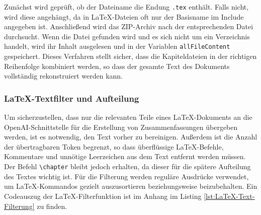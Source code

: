 
Zunächst wird geprüft, ob der Dateiname die Endung \texttt{.tex} enthält. Falls nicht, wird diese angehängt, da in LaTeX-Dateien oft nur der Basisname im Include angegeben ist. Anschließend wird das ZIP-Archiv nach der entsprechenden Datei durchsucht. Wenn die Datei gefunden wird und es sich nicht um ein Verzeichnis handelt, wird ihr Inhalt ausgelesen und in der Variablen \texttt{allFileContent} gespeichert. Dieses Verfahren stellt sicher, dass die Kapiteldateien in der richtigen Reihenfolge kombiniert werden, so dass der gesamte Text des Dokuments vollständig rekonstruiert werden kann.

\subsubsection{LaTeX-Textfilter und Aufteilung}

Um sicherzustellen, dass nur die relevanten Teile eines LaTeX-Dokuments an die OpenAI-Schnittstelle für die Erstellung von Zusammenfassungen übergeben werden, ist es notwendig, den Text vorher zu bereinigen. Außerdem ist die Anzahl der übertragbaren Token begrenzt, so dass überflüssige LaTeX-Befehle, Kommentare und unnötige Leerzeichen aus dem Text entfernt werden müssen. Der Befehl \texttt{\textbackslash chapter} bleibt jedoch erhalten, da dieser für die spätere Aufteilung des Textes wichtig ist. Für die Filterung werden reguläre Ausdrücke verwendet, um LaTeX-Kommandos gezielt auszusortieren beziehungsweise beizubehalten. Ein Codeauszug der LaTeX-Filterfunktion ist im Anhang im Listing \ref{lst:LaTeX-Text-Filterung} zu finden. 

